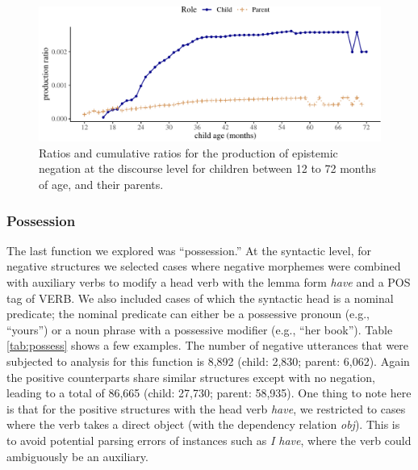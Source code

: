 \documentclass[
  english,
  man,floatsintext]{apa6}
\begin{document}
\begin{figure}[H]

{\centering \includegraphics{neg_construction_article_files/figure-latex/epistemicdiscourse-1} 

}

\caption{Ratios and cumulative ratios for the production of epistemic negation at the discourse level for children between 12 to 72 months of age, and their parents.}\label{fig:epistemicdiscourse}
\end{figure}

\hypertarget{possession}{%
\subsubsection{Possession}\label{possession}}

The last function we explored was ``possession.'' At the syntactic level, for negative structures we selected cases where negative morphemes were combined with auxiliary verbs to modify a head verb with the lemma form \emph{have} and a POS tag of VERB. We also included cases of which the syntactic head is a nominal predicate; the nominal predicate can either be a possessive pronoun (e.g., ``yours'') or a noun phrase with a possessive modifier (e.g., ``her book''). Table \ref{tab:possess} shows a few examples. The number of negative utterances that were subjected to analysis for this function is 8,892 (child: 2,830; parent: 6,062). Again the positive counterparts share similar structures except with no negation, leading to a total of 86,665 (child: 27,730; parent: 58,935). One thing to note here is that for the positive structures with the head verb \emph{have}, we restricted to cases where the verb takes a direct object (with the dependency relation \emph{obj}). This is to avoid potential parsing errors of instances such as \emph{I have}, where the verb could ambiguously be an auxiliary.
\end{document}
